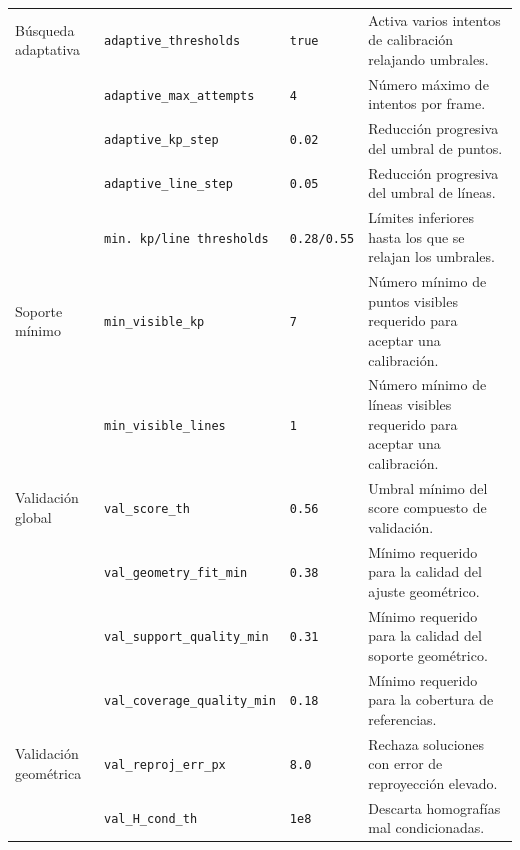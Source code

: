 \begin{table}[htbp]
\begin{tabularx}{\textwidth}{
>{\raggedright\arraybackslash}p{2.5cm}
>{\raggedright\arraybackslash}p{3.3cm}
>{\raggedright\arraybackslash}p{1.4cm}
>{\raggedright\arraybackslash}X
}
Búsqueda adaptativa &
\texttt{adaptive\_thresholds} &
\texttt{true} &
Activa varios intentos de calibración relajando umbrales. \\

&
\texttt{adaptive\_max\_attempts} &
\texttt{4} &
Número máximo de intentos por frame. \\

&
\texttt{adaptive\_kp\_step} &
\texttt{0.02} &
Reducción progresiva del umbral de puntos. \\

&
\texttt{adaptive\_line\_step} &
\texttt{0.05} &
Reducción progresiva del umbral de líneas. \\

&
\texttt{min. kp/line thresholds} &
\texttt{0.28/0.55} &
Límites inferiores hasta los que se relajan los umbrales. \\

\midrule

Soporte mínimo &
\texttt{min\_visible\_kp} &
\texttt{7} &
Número mínimo de puntos visibles requerido para aceptar una calibración. \\

&
\texttt{min\_visible\_lines} &
\texttt{1} &
Número mínimo de líneas visibles requerido para aceptar una calibración. \\

\midrule

Validación global &
\texttt{val\_score\_th} &
\texttt{0.56} &
Umbral mínimo del score compuesto de validación. \\

&
\texttt{val\_geometry\_fit\_min} &
\texttt{0.38} &
Mínimo requerido para la calidad del ajuste geométrico. \\

&
\texttt{val\_support\_quality\_min} &
\texttt{0.31} &
Mínimo requerido para la calidad del soporte geométrico. \\

&
\texttt{val\_coverage\_quality\_min} &
\texttt{0.18} &
Mínimo requerido para la cobertura de referencias. \\

\midrule

Validación geométrica &
\texttt{val\_reproj\_err\_px} &
\texttt{8.0} &
Rechaza soluciones con error de reproyección elevado. \\

&
\texttt{val\_H\_cond\_th} &
\texttt{1e8} &
Descarta homografías mal condicionadas. \\


\end{tabularx}
\end{table}

